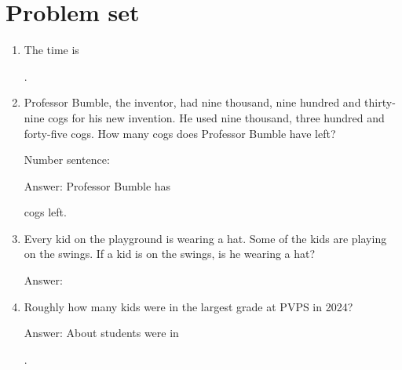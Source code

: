 \documentclass{tufte-book}
\begin{document}
\clearpage\section{Problem set }

\begin{enumerate}

\item {}
The time is \dotfill\bigskip\par\dotfill\bigskip.\par

\item Professor Bumble, the inventor, had nine thousand, nine hundred and thirty-nine cogs for his new invention.
He used nine thousand, three hundred and forty-five cogs. How many cogs does Professor Bumble have left?\bigskip\par
Number sentence: \dotfill\bigskip\par
Answer: Professor Bumble has 
\dotfill\bigskip\par\dotfill\bigskip cogs left.

\item Every kid on the playground is wearing a hat. Some of the kids are playing on the swings. If a kid is on the swings, is he wearing a hat?\bigskip\par
Answer: \dotfill\bigskip

\item Roughly how many kids were in the largest grade at PVPS in 2024?\bigskip\par
{}

Answer: About \dotfill\bigskip students were in\par \dotfill\bigskip.\par

\end{enumerate}
\end{document}
